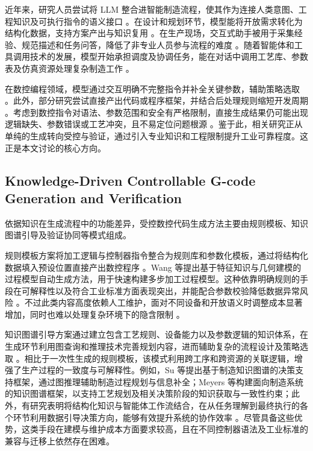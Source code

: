 \documentclass[journal,twoside,web]{ieeecolor}
\begin{document}
近年来，研究人员尝试将 LLM 整合进智能制造流程，使其作为连接人类意图、工程知识及可执行指令的语义接口 \cite{yu2026transformation}。在设计和规划环节，模型能将开放需求转化为结构化数据，支持方案产出与知识复用 \cite{xu2025large}。在生产现场，交互式助手被用于采集经验、规范描述和任务问答，降低了非专业人员参与流程的难度 \cite{kernan2024knowledge}。随着智能体和工具调用技术的发展，模型开始承担调度及协调任务，能在对话中调用工艺库、参数表及仿真资源处理复杂制造工作 \cite{garcia2024framework,huang2025leveraging}。

在数控编程领域，模型通过交互明确不完整指令并补全关键参数，辅助策略选取 \cite{abdelaal2025gllm,xie2025rapid}。此外，部分研究尝试直接产出代码或程序框架，并结合后处理规则缩短开发周期 \cite{fan2025automex}。考虑到数控指令对语法、参数范围和安全有严格限制，直接生成结果仍可能出现逻辑缺失、参数错误或工艺冲突，且不易定位问题根源 \cite{umre2026csllm,chen2025integrating}。鉴于此，相关研究正从单纯的生成转向受控与验证，通过引入专业知识和工程限制提升工业可靠程度。这正是本文讨论的核心方向。

\subsection{Knowledge-Driven Controllable G-code Generation and Verification}

依据知识在生成流程中的功能差异，受控数控代码生成方法主要由规则模板、知识图谱引导及验证协同等模式组成。

规则模板方案将加工逻辑与控制器指令整合为规则库和参数化模板，通过将结构化数据填入预设位置直接产出数控程序 \cite{huang2024effective,shi2025feature}。Wang 等提出基于特征知识与几何建模的过程模型自动生成方法，用于快速构建多步加工过程模型\cite{wang2024automatic}。这种依靠明确规则的手段在可解释性以及符合工业标准方面表现突出，并能配合参数校验降低数据异常风险 \cite{kaiyao2025novel}。不过此类内容高度依赖人工维护，面对不同设备和开放语义时调整成本显著增加，同时也难以处理复杂环境下的隐含限制 \cite{guo2024ontology}。

知识图谱引导方案通过建立包含工艺规则、设备能力以及参数逻辑的知识体系，在生成环节利用图查询和推理技术完善规划内容，进而辅助复杂的流程设计及策略选取 \cite{huang2025mkgmpp}。相比于一次性生成的规则模板，该模式利用跨工序和跨资源的关联逻辑，增强了生产过程的一致度与可解释性。例如，Su 等提出基于制造知识图谱的决策支持框架，通过图推理辅助制造过程规划与信息补全\cite{su2025knowledge}；Meyers 等构建面向制造系统的知识图谱框架，以支持工艺规划及相关决策阶段的知识获取与一致性约束\cite{meyers2024knowledge}；此外，有研究表明将结构化知识与智能体工作流结合，在从任务理解到最终执行的各个环节利用数据引导决策方向，能够有效提升系统的协作效率 \cite{qin2025knowledge}。尽管具备这些优势，这类手段在建模与维护成本方面要求较高，且在不同控制器语法及工业标准的兼容与迁移上依然存在困难。
\end{document}
